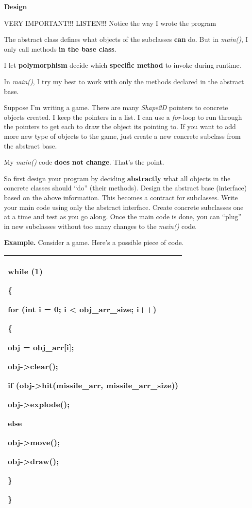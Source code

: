 \documentclass[
]{article}
\begin{document}
\textbf{Design}

VERY IMPORTANT!!! LISTEN!!! Notice the way I wrote the program

The abstract class defines what objects of the subclasses \textbf{can}
do. But in \emph{main()}, I only call methods \textbf{in the base
class}.

I let \textbf{polymorphism} decide which \textbf{specific method} to
invoke during runtime.

In \emph{main()}, I try my best to work with only the methods declared
in the abstract base.

Suppose I'm writing a game. There are many \emph{Shape2D} pointers to
concrete objects created. I keep the pointers in a list. I can use a
\emph{for}-loop to run through the pointers to get each to draw the
object its pointing to. If you want to add more new type of objects to
the game, just create a new concrete subclass from the abstract base.

My \emph{main()} code \textbf{does not change}. That's the point.

So first design your program by deciding \textbf{abstractly} what all
objects in the concrete classes should ``do'' (their methods). Design
the abstract base (interface) based on the above information. This
becomes a contract for subclasses. Write your main code using only the
abstract interface. Create concrete subclasses one at a time and test as
you go along. Once the main code is done, you can ``plug'' in new
subclasses without too many changes to the \emph{main()} code.

\textbf{Example.} Consider a game. Here's a possible piece of code.

\begin{longtable}[]{@{}l@{}}
\toprule
\endhead
\begin{minipage}[t]{0.97\columnwidth}\raggedright
while (1)

\{

\textbf{ }for (int i = 0; i \textless{} obj\_arr\_size; i++)

\textbf{ }\{

\textbf{ }obj = obj\_arr{[}i{]};

\textbf{ }obj-\textgreater clear();

\textbf{}if (obj-\textgreater hit(missile\_arr, missile\_arr\_size))

\textbf{} obj-\textgreater explode();

\textbf{}else

\textbf{} obj-\textgreater move();

\textbf{}obj-\textgreater draw();

\textbf{ }\}

\}\strut
\end{minipage}\tabularnewline
\bottomrule
\end{longtable}
\end{document}
